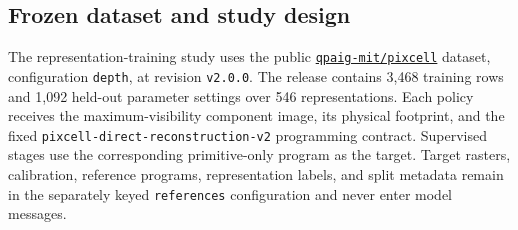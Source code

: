 %
%
%
%

\subsection{Frozen dataset and study design}

The representation-training study uses the public
\href{https://huggingface.co/datasets/qpaig-mit/pixcell}
{\texttt{qpaig-mit/pixcell}} dataset, configuration \texttt{depth}, at
revision \texttt{v2.0.0}. The release contains 3{,}468 training rows and
1{,}092 held-out parameter settings over 546 representations. Each policy
receives the maximum-visibility component image, its physical footprint, and
the fixed \texttt{pixcell-direct-reconstruction-v2} programming contract.
Supervised stages use the corresponding primitive-only program as the target.
Target rasters, calibration, reference programs, representation labels, and
split metadata remain in the separately keyed \texttt{references}
configuration and never enter model messages.

